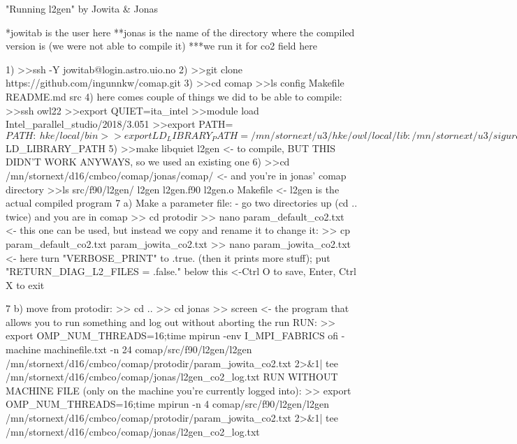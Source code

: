 "Running l2gen" by Jowita & Jonas

*jowitab is the user here
**jonas is the name of the directory where the compiled version is (we were not able to compile it)
***we run it for co2 field here

1) >>ssh -Y jowitab@login.astro.uio.no
2) >>git clone https://github.com/ingunnkw/comap.git
3) >>cd comap
   >>ls
   config Makefile README.md src
4) here comes couple of things we did to be able to compile:
   >>ssh owl22 
   >>export QUIET=ita_intel
   >>module load Intel_parallel_studio/2018/3.051
   >>export PATH=$PATH:~hke/local/bin
   >>export LD_LIBRARY_PATH=/mn/stornext/u3/hke/owl/local/lib:/mn/stornext/u3/sigurd\
kn/local/lib:$LD_LIBRARY_PATH
5) >>make libquiet l2gen <- to compile, BUT THIS DIDN'T WORK ANYWAYS, so we used an existing one
6) >>cd /mn/stornext/d16/cmbco/comap/jonas/comap/ <- and you're in jonas' comap directory
   >>ls src/f90/l2gen/
   l2gen l2gen.f90 l2gen.o Makefile  <- l2gen is the actual compiled program
7 a) Make a parameter file:
  - go two directories up (cd .. twice) and you are in comap
  >> cd protodir
  >> nano param_default_co2.txt <- this one can be used, but instead we copy and rename it to change it:
  >> cp param_default_co2.txt param_jowita_co2.txt
  >> nano param_jowita_co2.txt <- here turn "VERBOSE_PRINT" to .true. (then it prints more stuff); put "RETURN_DIAG_L2_FILES = .false." below this <-Ctrl O to save, Enter, Ctrl X to exit
   
7 b) move from protodir:
   >> cd ..
   >> cd jonas
   >> screen <- the program that allows you to run something and log out without aborting the run
   RUN:
   >> export OMP_NUM_THREADS=16;time mpirun -env I_MPI_FABRICS ofi -machine machinefile.txt -n 24 comap/src/f90/l2gen/l2gen /mn/stornext/d16/cmbco/comap/protodir/param_jowita_co2.txt 2>&1| tee /mn/stornext/d16/cmbco/comap/jonas/l2gen_co2_log.txt
   RUN WITHOUT MACHINE FILE (only on the machine you're currently logged into):
   >> export OMP_NUM_THREADS=16;time mpirun -n 4 comap/src/f90/l2gen/l2gen /mn/stornext/d16/cmbco/comap/protodir/param_jowita_co2.txt 2>&1| tee /mn/stornext/d16/cmbco/comap/jonas/l2gen_co2_log.txt
 
